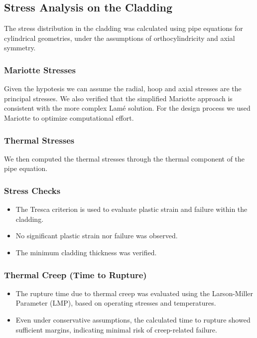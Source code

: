 \documentclass[11pt,a4paper,twoside]{article}
\begin{document}
\subsection{Stress Analysis on the Cladding}
The stress distribution in the cladding was calculated using pipe equations for cylindrical geometries, under the assumptions of orthocylindricity and axial symmetry.

\subsubsection{Mariotte Stresses}
Given the hypotesis we can assume the radial, hoop and axial stresses are the principal stresses.  
We also verified that the simplified Mariotte approach is consistent with the more complex Lamé solution. 
For the design process we used Mariotte to optimize computational effort.  

\subsubsection{Thermal Stresses}
We then computed the thermal stresses through the thermal component of the pipe equation.

\subsubsection{Stress Checks}
\begin{itemize}
    \item The Tresca criterion is used to evaluate plastic strain and failure within the cladding. 
    \item No significant plastic strain nor failure was observed.
    \item The minimum cladding thickness was verified.
\end{itemize}

\subsubsection{Thermal Creep (Time to Rupture)}
\begin{itemize}
    \item The rupture time due to thermal creep was evaluated using the Larson-Miller Parameter (LMP), based on operating stresses and temperatures.
    \item Even under conservative assumptions, the calculated time to rupture showed sufficient margins, indicating minimal risk of creep-related failure.
\end{itemize}
\end{document}
